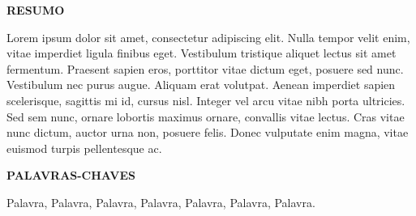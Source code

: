 \newpage
\thispagestyle{empty}
\begin{center}
    \uppercase{\textbf{Resumo}}
\end{center}
Lorem ipsum dolor sit amet, consectetur adipiscing elit. Nulla tempor velit enim, vitae imperdiet ligula finibus eget. Vestibulum tristique aliquet lectus sit amet fermentum. Praesent sapien eros, porttitor vitae dictum eget, posuere sed nunc. Vestibulum nec purus augue. Aliquam erat volutpat. Aenean imperdiet sapien scelerisque, sagittis mi id, cursus nisl. Integer vel arcu vitae nibh porta ultricies. Sed sem nunc, ornare lobortis maximus ornare, convallis vitae lectus. Cras vitae nunc dictum, auctor urna non, posuere felis. Donec vulputate enim magna, vitae euismod turpis pellentesque ac.


\begin{center}
    \uppercase{\textbf{Palavras-chaves}}
\end{center}
Palavra, Palavra, Palavra, Palavra, Palavra, Palavra, Palavra.
